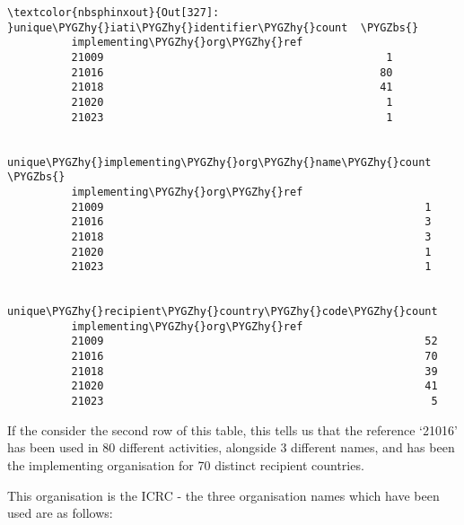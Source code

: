 \documentclass[letterpaper,10pt,english]{sphinxmanual}
\begin{document}
\begin{Verbatim}[commandchars=\\\{\}]
\textcolor{nbsphinxout}{Out[327]: }unique\PYGZhy{}iati\PYGZhy{}identifier\PYGZhy{}count  \PYGZbs{}
          implementing\PYGZhy{}org\PYGZhy{}ref
          21009                                            1
          21016                                           80
          21018                                           41
          21020                                            1
          21023                                            1
          
                                unique\PYGZhy{}implementing\PYGZhy{}org\PYGZhy{}name\PYGZhy{}count  \PYGZbs{}
          implementing\PYGZhy{}org\PYGZhy{}ref
          21009                                                  1
          21016                                                  3
          21018                                                  3
          21020                                                  1
          21023                                                  1
          
                                unique\PYGZhy{}recipient\PYGZhy{}country\PYGZhy{}code\PYGZhy{}count
          implementing\PYGZhy{}org\PYGZhy{}ref
          21009                                                  52
          21016                                                  70
          21018                                                  39
          21020                                                  41
          21023                                                   5
\end{Verbatim}

If the consider the second row of this table, this tells us that the
reference `21016' has been used in 80 different activities, alongside 3
different names, and has been the implementing organisation for 70
distinct recipient countries.

This organisation is the ICRC - the three organisation names which have
been used are as follows:
\end{document}
